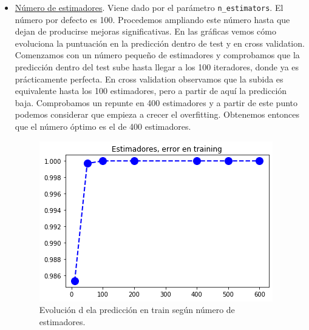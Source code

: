 \documentclass[11pt,a4paper]{article}
\begin{document}
\begin{itemize}
\item \underline{Número de estimadores}. Viene dado por el parámetro \texttt{n\_estimators}. El número por defecto es 100. Procedemos ampliando este número hasta que dejan de producirse mejoras significativas. En las gráficas vemos cómo evoluciona la puntuación en la predicción dentro de test y en cross validation. Comenzamos con un número pequeño de estimadores y comprobamos que la predicción dentro del test sube hasta llegar a los 100 iteradores, donde ya es prácticamente perfecta. En cross validation observamos que la subida es equivalente hasta los 100 estimadores, pero a partir de aquí la predicción baja. Comprobamos un repunte en 400 estimadores y a partir de este punto podemos considerar que empieza a crecer el overfitting. Obtenemos entonces que el número óptimo es el de 400 estimadores.

    \begin{figure}[h!]
      \label{figure:rf_estimadores_ein}
      \centering
      \includegraphics[width=\textwidth, scale = 0.3]{./figures/rf_estimadores_ein.png}
      \caption{Evolución d ela predicción en train según número de estimadores.}
    \end{figure}



\end{itemize}
\end{document}
